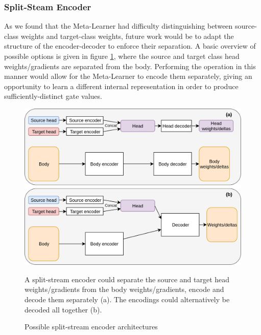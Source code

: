 \documentclass{report}
\begin{document}
\subsubsection{Split-Steam Encoder}
As we found that the Meta-Learner had difficulty distinguishing between source-class weights and target-class weights, future work would be to adapt the structure of the encoder-decoder to enforce their separation. A basic overview of possible options is given in figure \ref{fig:split-stream:1}, where the source and target class head weights/gradients are separated from the body. Performing the operation in this manner would allow for the Meta-Learner to encode them separately, giving an opportunity to learn a different internal representation in order to produce sufficiently-distinct gate values.

\begin{figure}[!h]
	\centering
	\includegraphics[width=13cm]{split-stream}
	\caption{Possible split-stream encoder architectures}
	\label{fig:split-stream:1}
	A split-stream encoder could separate the source and target head weights/gradients from the body weights/gradients, encode and decode them separately (a). The encodings could alternatively be decoded all together (b).
\end{figure}




\printbibliography
\end{document}
